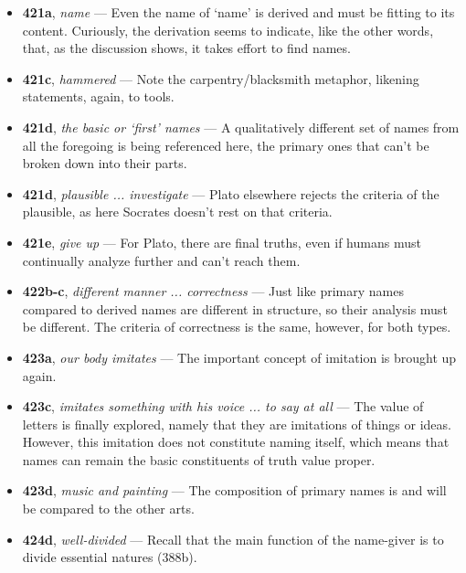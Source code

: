 \documentclass[12pt]{article}
\begin{document}
\begin{itemize}

\item \textbf{421a}, \textit{name} --- Even the name of `name' is derived and must be fitting to its content. Curiously, the derivation seems to indicate, like the other words, that, as the discussion shows, it takes effort to find names. 

\item \textbf{421c}, \textit{hammered} --- Note the carpentry/blacksmith metaphor, likening statements, again, to tools.

\item \textbf{421d}, \textit{the basic or `first' names} --- A qualitatively different set of names from all the foregoing is being referenced here, the primary ones that can't be broken down into their parts.

\item \textbf{421d}, \textit{plausible ... investigate} --- Plato elsewhere rejects the criteria of the plausible, as here Socrates doesn't rest on that criteria.

\item \textbf{421e}, \textit{give up} --- For Plato, there are final truths, even if humans must continually analyze further and can't reach them.

\item \textbf{422b-c}, \textit{different manner ... correctness} --- Just like primary names compared to derived names are different in structure, so their analysis must be different. The criteria of correctness is the same, however, for both types.

\item \textbf{423a}, \textit{our body imitates} --- The important concept of imitation is brought up again.

\item \textbf{423c}, \textit{imitates something with his voice ... to say at all} --- The value of letters is finally explored, namely that they are imitations of things or ideas. However, this imitation does not constitute naming itself, which means that names can remain the basic constituents of truth value proper.

\item \textbf{423d}, \textit{music and painting} --- The composition of primary names is and will be compared to the other arts.

\item \textbf{424d}, \textit{well-divided} --- Recall that the main function of the name-giver is to divide essential natures (388b).


\end{itemize}
\end{document}
